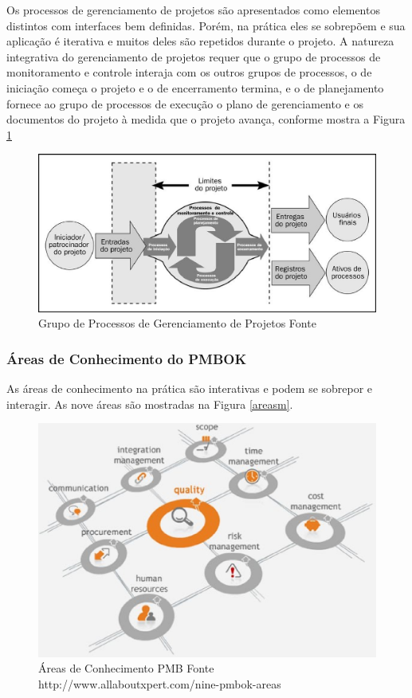 Os processos de gerenciamento de projetos são apresentados como elementos distintos com interfaces bem definidas. Porém, na prática eles se sobrepõem e sua aplicação é iterativa e muitos deles são repetidos durante o projeto. A natureza integrativa do gerenciamento de projetos requer que o grupo de processos de monitoramento e controle interaja com os outros grupos de processos, o de iniciação começa o projeto e o de encerramento termina, e o de planejamento fornece ao grupo de processos de execução o plano de gerenciamento e os documentos do projeto à medida que o projeto avança, conforme mostra a Figura \ref{grupoprocessospmi}
\begin{figure}[!htb]
	\centering
		\includegraphics[scale=0.7]{figuras/grupoprocessospmi.eps}
		\caption{Grupo de Processos de Gerenciamento de Projetos Fonte \cite{pmbok}}
		\label{grupoprocessospmi}
\end{figure}
\subsubsection{Áreas de Conhecimento do PMBOK}
As áreas de conhecimento na prática são interativas e podem se sobrepor e interagir. As nove áreas são mostradas na Figura \ref{areasm}.
\begin{figure}[!htb]
	\centering
		\includegraphics[scale=0.7]{figuras/areaspmi.eps}
		\caption{Áreas de Conhecimento PMB Fonte {http://www.allaboutxpert.com/nine-pmbok-areas}}
		\label{areaspmi}
\end{figure}

